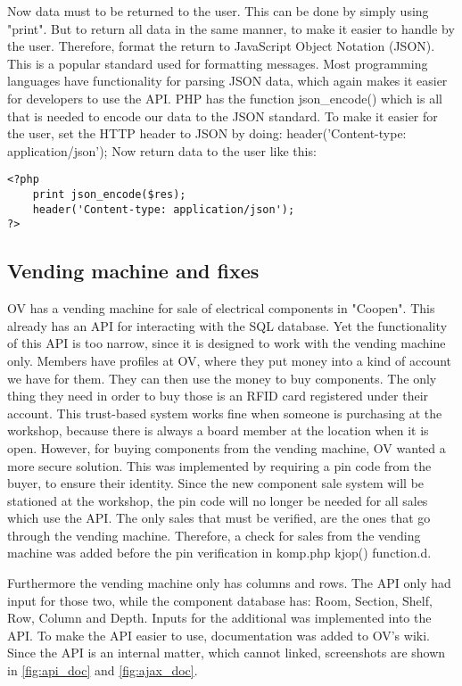 Now data must to be returned to the user. This can be done by simply using "print". But to return all data in the same manner, to make it easier to handle by the user. Therefore, format the return to JavaScript Object Notation (JSON). This is a popular standard used for formatting messages. Most programming languages have functionality for parsing JSON data, which again makes it easier for developers to use the API. PHP has the function json\_encode() which is all that is needed to encode our data to the JSON standard. To make it easier for the user, set the HTTP header to JSON by doing: header('Content-type: application/json'); Now return data to the user like this:
\begin{verbatim}
<?php
    print json_encode($res);
    header('Content-type: application/json');
?>
\end{verbatim}

\subsection{Vending machine and fixes} \label{sec:vending_machine}
OV has a vending machine for sale of electrical components in "Coopen". This already has an API for interacting with the SQL database. Yet the functionality of this API is too narrow, since it is designed to work with the vending machine only. 
Members have profiles at OV, where they put money into a kind of account we have for them. They can then use the money to buy components. The only thing they need in order to buy those is an RFID card registered under their account. This trust-based system works fine when someone is purchasing at the workshop, because there is always a board member at the location when it is open. However, for buying components from the vending machine, OV wanted a more secure solution. This was implemented by requiring a pin code from the buyer, to ensure their identity. 
Since the new component sale system will be stationed at the workshop, the pin code will no longer be needed for all sales which use the API. The only sales that must be verified, are the ones that go through the vending machine. Therefore, a check for sales from the vending machine was added before the pin verification in komp.php kjop() function.d. 

Furthermore the vending machine only has columns and rows. The API only had input for those two, while the component database has: Room, Section, Shelf, Row, Column and Depth. Inputs for the additional was implemented into the API. To make the API easier to use, documentation was added to OV's wiki. Since the API is an internal matter, which cannot linked, screenshots are shown in \cref{fig:api_doc} and \cref{fig:ajax_doc}. 


